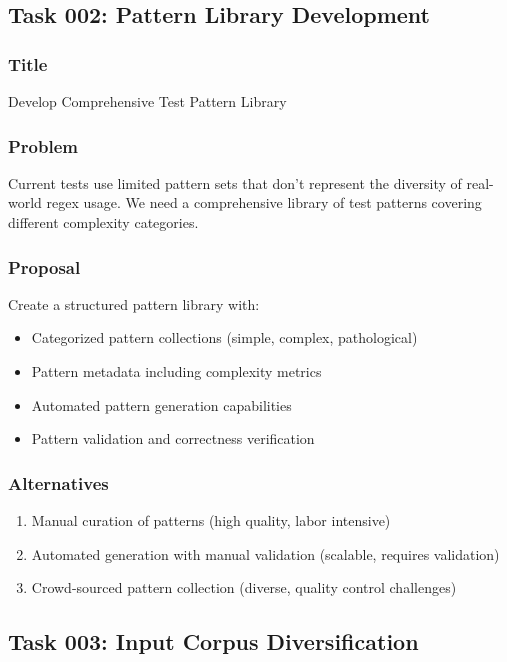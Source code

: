 \documentclass[11pt,a4paper]{article}
\begin{document}
\subsection{Task 002: Pattern Library Development}

\subsubsection{Title}
Develop Comprehensive Test Pattern Library

\subsubsection{Problem}
Current tests use limited pattern sets that don't represent the diversity of real-world regex usage. We need a comprehensive library of test patterns covering different complexity categories.

\subsubsection{Proposal}
Create a structured pattern library with:
\begin{itemize}
    \item Categorized pattern collections (simple, complex, pathological)
    \item Pattern metadata including complexity metrics
    \item Automated pattern generation capabilities
    \item Pattern validation and correctness verification
\end{itemize}

\subsubsection{Alternatives}
\begin{enumerate}
    \item Manual curation of patterns (high quality, labor intensive)
    \item Automated generation with manual validation (scalable, requires validation)
    \item Crowd-sourced pattern collection (diverse, quality control challenges)
\end{enumerate}

\subsection{Task 003: Input Corpus Diversification}
\end{document}
